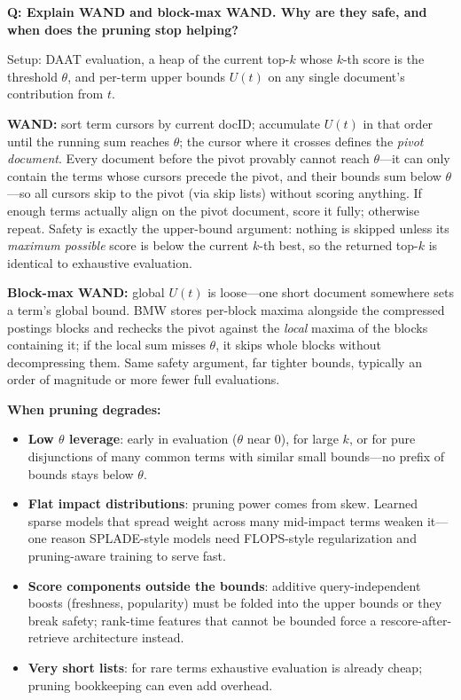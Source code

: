 \begin{interviewq}
\textbf{Q: Explain WAND and block-max WAND. Why are they safe, and when does the pruning stop helping?}

 \quad {} \quad \badgefreq{\freqmed}

\stronganswer

Setup: DAAT evaluation, a heap of the current top-$k$ whose $k$-th score is the threshold $\theta$, and per-term upper bounds $U(t)$ on any single document's contribution from $t$.

\textbf{WAND:} sort term cursors by current docID; accumulate $U(t)$ in that order until the running sum reaches $\theta$; the cursor where it crosses defines the \emph{pivot document}. Every document before the pivot provably cannot reach $\theta$---it can only contain the terms whose cursors precede the pivot, and their bounds sum below $\theta$---so all cursors skip to the pivot (via skip lists) without scoring anything. If enough terms actually align on the pivot document, score it fully; otherwise repeat. Safety is exactly the upper-bound argument: nothing is skipped unless its \emph{maximum possible} score is below the current $k$-th best, so the returned top-$k$ is identical to exhaustive evaluation.

\textbf{Block-max WAND:} global $U(t)$ is loose---one short document somewhere sets a term's global bound. BMW stores per-block maxima alongside the compressed postings blocks and rechecks the pivot against the \emph{local} maxima of the blocks containing it; if the local sum misses $\theta$, it skips whole blocks without decompressing them. Same safety argument, far tighter bounds, typically an order of magnitude or more fewer full evaluations.

\textbf{When pruning degrades:}
\begin{itemize}
    \item \textbf{Low $\theta$ leverage}: early in evaluation ($\theta$ near 0), for large $k$, or for pure disjunctions of many common terms with similar small bounds---no prefix of bounds stays below $\theta$.
    \item \textbf{Flat impact distributions}: pruning power comes from skew. Learned sparse models that spread weight across many mid-impact terms weaken it---one reason SPLADE-style models need FLOPS-style regularization and pruning-aware training to serve fast.
    \item \textbf{Score components outside the bounds}: additive query-independent boosts (freshness, popularity) must be folded into the upper bounds or they break safety; rank-time features that cannot be bounded force a rescore-after-retrieve architecture instead.
    \item \textbf{Very short lists}: for rare terms exhaustive evaluation is already cheap; pruning bookkeeping can even add overhead.
\end{itemize}


\end{interviewq}
